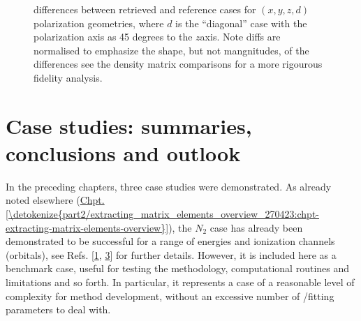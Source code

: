\documentclass[letterpaper,table,10pt,english]{jupyterBook}
\begin{document}
\begin{figure}[htbp]
\centering
\capstart

\noindent{}
\caption{{\hyperref[\detokenize{backmatter/glossary:term-MF}]{}} differences between retrieved and reference cases for \((x,y,z,d)\) polarization geometries, where \(d\) is the “diagonal” case with the polarization axis as 45 degrees to the \(z\)\sphinxhyphen{}axis. Note diffs are normalised to emphasize the shape, but not mangnitudes, of the differences \sphinxhyphen{} see the density matrix comparisons for a more rigourous fidelity analysis.}\label{\detokenize{part2/case-study-C2H4_290723:fig-c2h4-diff}}\end{figure}

\sphinxstepscope


\chapter{Case studies: summaries, conclusions and outlook}
\label{\detokenize{part2/case-study-summaries_240723:case-studies-summaries-conclusions-and-outlook}}\label{\detokenize{part2/case-study-summaries_240723:chpt-case-study-summaries}}\label{\detokenize{part2/case-study-summaries_240723::doc}}
\sphinxAtStartPar
In the preceding chapters, three case studies were demonstrated. As already noted elsewhere (\hyperref[\detokenize{part2/extracting_matrix_elements_overview_270423:chpt-extracting-matrix-elements-overview}]{Chpt.\@ \ref{\detokenize{part2/extracting_matrix_elements_overview_270423:chpt-extracting-matrix-elements-overview}}}), the \(N_2\) case has already been demonstrated to be successful for a range of energies and ionization channels (orbitals), see Refs. {[}\hyperlink{cite.backmatter/bibliography:id776}{1}, \hyperlink{cite.backmatter/bibliography:id686}{3}{]} for further details. However, it is included here as a benchmark case, useful for testing the methodology, computational routines and limitations and so forth. In particular, it represents a case of a reasonable level of complexity for method development, without an excessive number of {\hyperref[\detokenize{backmatter/glossary:term-radial-matrix-elements}]{}}/fitting parameters to deal with.
\end{document}
